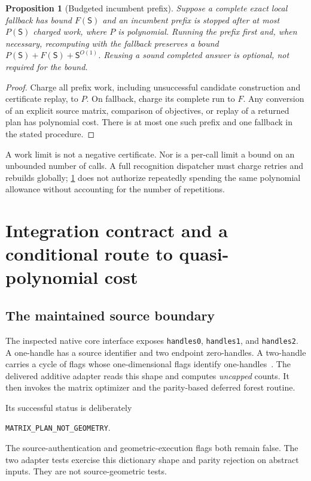 \documentclass[11pt,letterpaper]{article}
\newtheorem{proposition}[proposition]{Proposition}\aliascntresetthe{proposition}
\theoremstyle{definition}
\theoremstyle{remark}
\newcommand{\code}[1]{\texttt{\small #1}}
\newcommand{\size}{\mathsf S}
\begin{document}
\begin{proposition}[Budgeted incumbent prefix]
\label{prop:portfolio}
Suppose a complete exact local fallback has bound $F(\size)$ and an incumbent prefix is stopped after at most $P(\size)$ charged work, where $P$ is polynomial. Running the prefix first and, when necessary, recomputing with the fallback preserves a bound $P(\size)+F(\size)+\size^{O(1)}$. Reusing a sound completed answer is optional, not required for the bound.
\end{proposition}
\begin{proof}
Charge all prefix work, including unsuccessful candidate construction and certificate replay, to $P$. On fallback, charge its complete run to $F$. Any conversion of an explicit source matrix, comparison of objectives, or replay of a returned plan has polynomial cost. There is at most one such prefix and one fallback in the stated procedure.
\end{proof}

A work limit is not a negative certificate. Nor is a per-call limit a bound on an unbounded number of calls. A full recognition dispatcher must charge retries and rebuilds globally; \cref{prop:portfolio} does not authorize repeatedly spending the same polynomial allowance without accounting for the number of repetitions.

\section{Integration contract and a conditional route to quasi-polynomial cost}
\label{sec:integration}

\subsection{The maintained source boundary}
The inspected native core interface exposes \code{handles0}, \code{handles1}, and \code{handles2}. A one-handle has a source identifier and two endpoint zero-handles. A two-handle carries a cycle of flags whose one-dimensional flags identify one-handles~\cite{provecore}. The delivered additive adapter reads this shape and computes \emph{uncapped} counts. It then invokes the matrix optimizer and the parity-based deferred forest routine.

Its successful status is deliberately
\begin{center}
\code{MATRIX\_PLAN\_NOT\_GEOMETRY}.
\end{center}
The source-authentication and geometric-execution flags both remain false. The two adapter tests exercise this dictionary shape and parity rejection on abstract inputs. They are not source-geometric tests.
\end{document}
